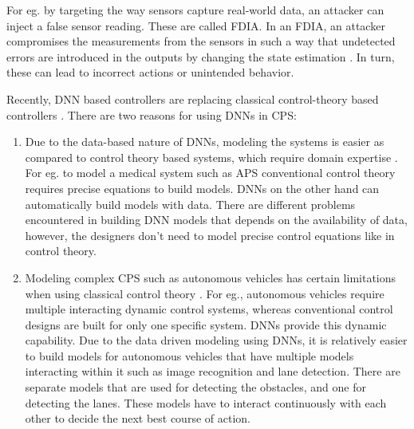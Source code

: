 For eg. by targeting the way sensors capture real-world data, an attacker can inject a false sensor reading. These are called \ac{FDIA}. In an FDIA, an attacker compromises the measurements from the sensors in such a way that undetected errors are introduced in the outputs by changing the state estimation \cite{7438916}. In turn, these can lead to incorrect actions or unintended behavior. 



Recently,  \ac{DNN} based controllers are replacing classical control-theory based controllers \cite{xiang18} \cite{Kocic2019} \cite{bechtel2017deeppicar}. There are two reasons for using DNNs in CPS: %
\begin{enumerate}
	\item  Due to the data-based nature of DNNs, modeling the systems is easier as compared to control theory based systems, which require domain expertise \cite{Aamir_2013}. For eg. to model a medical system such as \ac{APS} conventional control theory requires precise equations to build models. DNNs on the other hand can automatically build models with data. There are different problems encountered in building DNN models that depends on the availability of  data, however, the designers don't need to model precise control equations like in control theory. 
		\item  Modeling complex CPS such as autonomous vehicles has certain limitations when using classical control theory \cite{article23}. For eg., autonomous vehicles require multiple interacting dynamic control systems, whereas conventional control designs are built for only one specific system. DNNs provide this dynamic capability. Due to the data driven modeling using DNNs, it is relatively easier to build models for autonomous vehicles that have multiple models interacting within it such as image recognition and lane detection. There are separate models that are used for detecting the obstacles, and one for detecting the lanes. These models have to interact continuously with each other to decide the next best course of action.
\end{enumerate}


